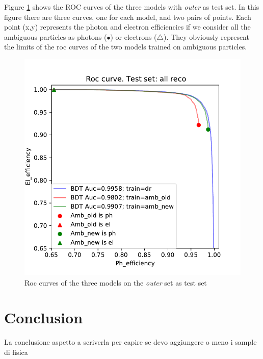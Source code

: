 \documentclass[a4paper, oneside]{book}
\begin{document}
			Figure \ref{fig:last_roc} shows the ROC curves of the three models with \textit{outer} as test set. In this figure there are three curves, one for each model, and two pairs of points. Each point (x,y) represents the photon and electron efficiencies if we consider all the ambiguous particles as photons ($\bullet$) or electrons ($\triangle$). They obviously represent the limits of the roc curves of the two models trained on ambiguous particles.
			
			\begin{figure}[h!]
				\centering
				\includegraphics[width=.7\linewidth]{tesi_images/all_amb_roc.pdf} 
				\caption{Roc curves of the three models on the \textit{outer} set as test set} 
				\label{fig:last_roc}
			\end{figure}
		
		
		
		
	\chapter*{Conclusion}
		La conclusione aspetto a scriverla per capire se devo aggiungere o meno i sample di fisica
	\appendix
\end{document}
